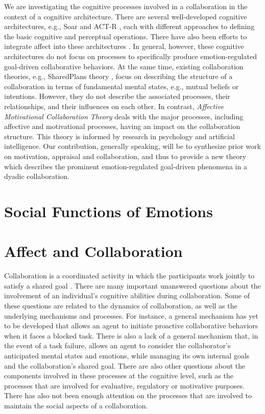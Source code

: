 \documentclass[letterpaper]{article}
\begin{document}
We are investigating the cognitive processes involved in a collaboration in the
context of a cognitive architecture. There are several well-developed cognitive
architectures, e.g., Soar \cite{laird:soar} and ACT-R \cite{anderson:act-r},
each with different approaches to defining the basic cognitive and perceptual
operations. There have also been efforts to integrate affect into these
architectures \cite{dancy:actR-physiology-affect,marinier:behavior-emotion}. In
general, however, these cognitive architectures do not focus on processes to
specifically produce emotion-regulated goal-driven collaborative behaviors. At
the same time, existing collaboration theories, e.g., SharedPlans theory
\cite{grosz:plans-discourse}, focus on describing the structure of a
collaboration in terms of fundamental mental states, e.g., mutual beliefs or
intentions. However, they do not describe the associated processes, their
relationships, and their influences on each other. In contrast,
\textit{Affective Motivational Collaboration Theory} deals with the major
processes, including affective and motivational processes, having an impact on
the collaboration structure. This theory is informed by research in psychology
and artificial intelligence. Our contribution, generally speaking, will be to
synthesize prior work on motivation, appraisal and collaboration, and thus to
provide a new theory which describes the prominent emotion-regulated goal-driven
phenomena in a dyadic collaboration.

\section{Social Functions of Emotions}

\section{Affect and Collaboration}

Collaboration is a coordinated activity in which the participants work jointly
to satisfy a shared goal \cite{grosz:plans-discourse}. There are many important
unanswered questions about the involvement of an individual's cognitive
abilities during collaboration. Some of these questions are related to the
dynamics of collaboration, as well as the underlying mechanisms and processes.
For instance, a general mechanism has yet to be developed that allows an agent
to initiate proactive collaborative behaviors when it faces a blocked task.
There is also a lack of a general mechanism that, in the event of a task
failure, allows an agent to consider the collaborator's anticipated mental
states and emotions, while managing its own internal goals and the
collaboration's shared goal. There are also other questions about the components
involved in these processes at the cognitive level, such as the processes that
are involved for evaluative, regulatory or motivative purposes. There has also
not been enough attention on the processes that are involved to maintain the
social aspects of a collaboration.
\end{document}
